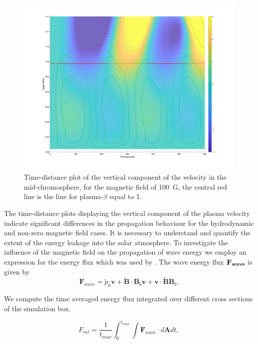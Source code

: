 \documentclass[physics,article,submit,pdftex,moreauthors]{Definitions/mdpi}
\begin{document}
\begin{figure}
\centering
\label{td_vert_dif_bv0G_100G_300}
\includegraphics[scale=0.163]{td_vert_bv100G_300_with_bandbeta.jpeg}
\caption{Time-distance plot of the vertical component of the velocity in the mid-chromosphere, for the magnetic field of 100~G, the central red line is the line for plasma-$\beta$  equal to 1.}
\end{figure}

The time-distance plots displaying the vertical component of the plasma velocity indicate significant differences in the propagation behaviour for the hydrodynamic and non-zero magnetic field cases. It is necessary to understand and quantify the extent of the energy leakage into the solar atmosphere. To investigate the influence of the magnetic field on the propagation of wave energy we employ an expression for the energy flux which was used by \cite{Bogdan2003}. The wave energy flux $\bf{F}_{wave}$ is given by
$$
{\mathbf F}_{wave}=\tilde{p}_{k} {\mathbf v}+\tilde{\mathbf B}\cdot {\mathbf B_{b}}{\mathbf v}+{\mathbf v}\cdot \tilde{\mathbf B}{\mathbf B_{b}} .
$$

We compute the time averaged energy flux integrated over different cross sections of the simulation box.

\begin{equation}
F_{int}= \frac{1}{t_{max}} \int_{0}^{t_{max}} \int {\mathbf F}_{wave} \cdot d{\mathbf A}dt,
\label{e11}
\end{equation}
\end{document}
